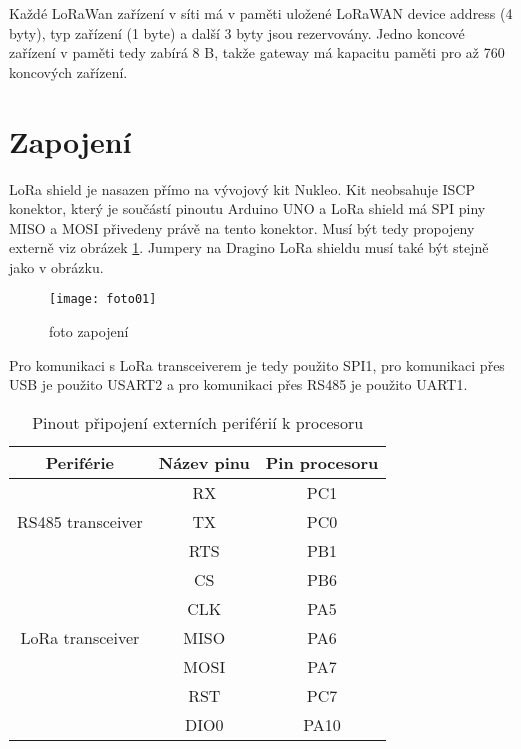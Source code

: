 Každé LoRaWan zařízení v síti má v paměti uložené LoRaWAN device address (4 byty), typ zařízení (1 byte) a další 3 byty jsou rezervovány. 
Jedno koncové zařízení v paměti tedy zabírá  8 B, takže gateway má kapacitu paměti pro až 760 koncových zařízení.


\section{Zapojení}
LoRa shield \cite{draginoWiki} je nasazen přímo na vývojový kit Nukleo. Kit neobsahuje ISCP konektor, který je součástí pinoutu Arduino UNO a LoRa shield má SPI piny MISO a MOSI přivedeny právě na tento konektor. Musí být tedy propojeny externě viz obrázek \ref{fig:03}. Jumpery na Dragino LoRa shieldu musí také být stejně jako v obrázku.

\begin{figure}[!h]
    \centering
    \texttt{[image: foto01]}
    \caption{foto zapojení}
    \label{fig:03}
\end{figure}

Pro komunikaci s LoRa transceiverem je tedy použito SPI1, pro komunikaci přes USB je použito USART2 a pro komunikaci přes RS485 je použito UART1.

\begin{table}[h]
    \centering
    \begin{tabular}{ |c|c|c| }
     \hline

     Periférie          & Název pinu & Pin procesoru           \\ \hline \hline

                        & RX  &   PC1            \\
    RS485 transceiver   & TX  &   PC0       \\
                        & RTS  &  PB1      \\     \hline

                        & CS    &  PB6             \\
                        & CLK   &  PA5        \\
   LoRa transceiver     & MISO  &  PA6     \\
                        & MOSI  &  PA7        \\
                        & RST   & PC7          \\
                        & DIO0  & PA10         \\
                        \hline

    \end{tabular}
    \caption{Pinout připojení externích periférií k procesoru}
    \label{table:3}
\end{table}

